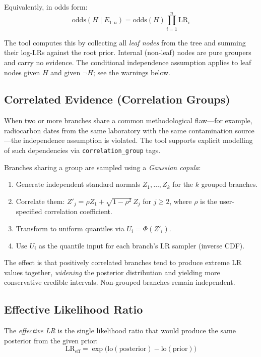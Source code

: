 \documentclass[11pt,a4paper]{article}
\begin{document}
Equivalently, in odds form:
\begin{equation}
\text{odds}(H \mid E_{1:n}) = \text{odds}(H) \prod_{i=1}^{n} \text{LR}_i
\end{equation}

The tool computes this by collecting all \emph{leaf nodes} from the tree and
summing their log-LRs against the root prior.  Internal (non-leaf) nodes are
pure groupers and carry no evidence.  The conditional independence assumption
applies to leaf nodes given $H$ and given $\neg H$; see the warnings below.

\subsection{Correlated Evidence (Correlation Groups)}

When two or more branches share a common methodological flaw---for example,
radiocarbon dates from the same laboratory with the same contamination
source---the independence assumption is violated.  The tool supports explicit
modelling of such dependencies via \texttt{correlation\_group} tags.

Branches sharing a group are sampled using a \emph{Gaussian copula}:
\begin{enumerate}
\item Generate independent standard normals $Z_1, \ldots, Z_k$ for the $k$
  grouped branches.
\item Correlate them: $Z'_j = \rho Z_1 + \sqrt{1-\rho^2}\, Z_j$ for $j \geq 2$,
  where $\rho$ is the user-specified correlation coefficient.
\item Transform to uniform quantiles via $U_i = \Phi(Z'_i)$.
\item Use $U_i$ as the quantile input for each branch's LR sampler (inverse CDF).
\end{enumerate}

The effect is that positively correlated branches tend to produce extreme LR
values together, \emph{widening} the posterior distribution and yielding more
conservative credible intervals.  Non-grouped branches remain independent.

\subsection{Effective Likelihood Ratio}

The \emph{effective LR} is the single likelihood ratio that would produce the
same posterior from the given prior:
\begin{equation}
\text{LR}_{\text{eff}} = \exp\!\Big(\text{lo}(\text{posterior}) - \text{lo}(\text{prior})\Big)
\end{equation}
\end{document}
